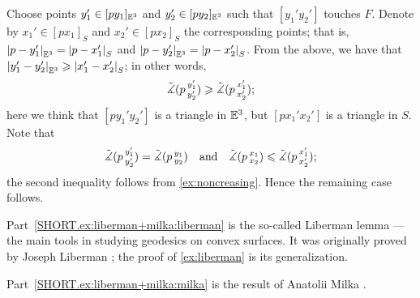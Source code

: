 Choose points $y_1'\in [py_1]_{\mathbb{E}^3}$ and $y_2'\in [py_2]_{\mathbb{E}^3}$ such that $[y_1'y_2']$ touches $F$.
Denote by $x_1'\in [px_1]_{S}$ and $x_2'\in [px_2]_{S}$ the corresponding points;
that is, $|{p}-{y_1'}|_{\mathbb{E}^3}^{{}}=|{p}-{x_1'}|_{S}^{{}}$ and $|{p}-{y_2'}|_{\mathbb{E}^3}^{{}}=|{p}-{x_2'}|_{S}^{{}}$.
From the above, we have that $|{y_1'}-{y_2'}|_{\mathbb{E}^3}^{{}}\geqslant|{x_1'}-{x_2'}|_{S}^{{}}$;
in other words, 
\[\tilde\measuredangle(p\,{}^{y_1'}_{y_2'})\geqslant \tilde\measuredangle(p\,{}^{x_1'}_{x_2'});\]
here we think that $[p{y_1'}{y_2'}]$ is a triangle in $\mathbb{E}^3$, but $[p{x_1'}{x_2'}]$ is a triangle in $S$.
Note that 
\[\tilde\measuredangle(p\,{}^{y_1'}_{y_2'})=\tilde\measuredangle(p\,{}^{y_1}_{y_2})
\quad\text{and}\quad
\tilde\measuredangle(p\,{}^{x_1}_{x_2})\leqslant \tilde\measuredangle(p\,{}^{x_1'}_{x_2'});
\]
the second inequality follows from \ref{ex:noncreasing}.
Hence the remaining case follows.

Part~\ref{SHORT.ex:liberman+milka:liberman} is the so-called Liberman lemma --- the main tools in studying geodesics on convex surfaces.
It was originally proved by Joseph Liberman \cite{liberman}; the proof of \ref{ex:liberman} is its generalization. 

Part~\ref{SHORT.ex:liberman+milka:milka} is the result of Anatolii Milka \cite[Theorem 2]{milka1982}.

